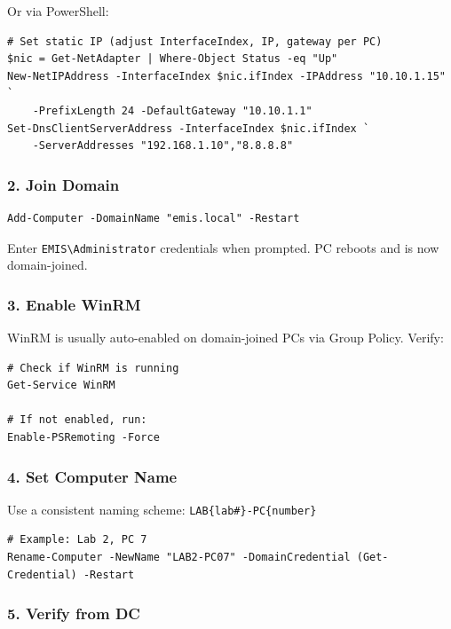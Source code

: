 ﻿\documentclass[12pt,a4paper]{article}
\begin{document}
Or via PowerShell:

\begin{lstlisting}
# Set static IP (adjust InterfaceIndex, IP, gateway per PC)
$nic = Get-NetAdapter | Where-Object Status -eq "Up"
New-NetIPAddress -InterfaceIndex $nic.ifIndex -IPAddress "10.10.1.15" `
    -PrefixLength 24 -DefaultGateway "10.10.1.1"
Set-DnsClientServerAddress -InterfaceIndex $nic.ifIndex `
    -ServerAddresses "192.168.1.10","8.8.8.8"
\end{lstlisting}

\subsubsection{2. Join Domain}

\begin{lstlisting}
Add-Computer -DomainName "emis.local" -Restart
\end{lstlisting}

Enter \texttt{EMIS\textbackslash Administrator} credentials when prompted. PC reboots and is now domain-joined.

\subsubsection{3. Enable WinRM}

WinRM is usually auto-enabled on domain-joined PCs via Group Policy. Verify:

\begin{lstlisting}
# Check if WinRM is running
Get-Service WinRM

# If not enabled, run:
Enable-PSRemoting -Force
\end{lstlisting}

\subsubsection{4. Set Computer Name}

Use a consistent naming scheme: \texttt{LAB\{lab\#\}-PC\{number\}}

\begin{lstlisting}
# Example: Lab 2, PC 7
Rename-Computer -NewName "LAB2-PC07" -DomainCredential (Get-Credential) -Restart
\end{lstlisting}

\subsubsection{5. Verify from DC}
\end{document}
